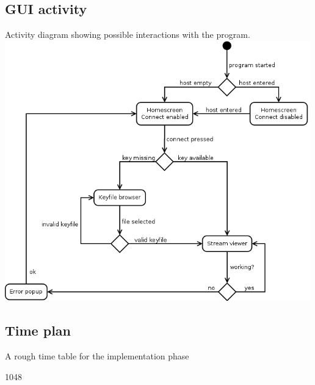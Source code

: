 \documentclass[a4paper,10pt]{scrartcl}
\begin{document}
\subsection{GUI activity}
\begin{illustration}{Activity diagram showing possible interactions with the program.}
\includegraphics [width=500px]{figures/gui_activity_1/gui_activity_1.png}
\end{illustration}


\begin{landscape}
\section{Time plan}
   \begin{illustration}{A rough time table for the implementation phase}
  \begin{gantt}[xunitlength=0.5cm,fontsize=\small,titlefontsize=\small,drawledgerline=true]{10}{48}
    \begin{ganttitle}
    \end{ganttitle}
    \begin{ganttitle}
    \end{ganttitle}
  \end{gantt}
  \end{illustration}
\end{landscape}
\end{document}
